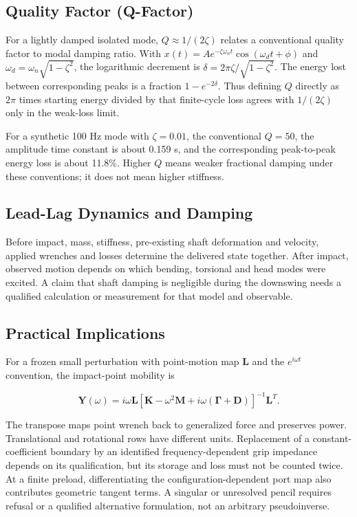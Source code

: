 \subsection{Quality Factor (Q-Factor)}\label{quality-factor-q-factor}

For a lightly damped isolated mode, \(Q\approx1/(2\zeta)\) relates a conventional quality factor to modal damping ratio. With \(x(t)=A e^{-\zeta\omega_n t}\cos(\omega_d t+\phi)\) and \(\omega_d=\omega_n\sqrt{1-\zeta^2}\), the logarithmic decrement is \(\delta=2\pi\zeta/\sqrt{1-\zeta^2}\). The energy lost between corresponding peaks is a fraction \(1-e^{-2\delta}\). Thus defining \(Q\) directly as \(2\pi\) times starting energy divided by that finite-cycle loss agrees with \(1/(2\zeta)\) only in the weak-loss limit.

For a synthetic 100 Hz mode with \(\zeta=0.01\), the conventional \(Q=50\), the amplitude time constant is about 0.159 s, and the corresponding peak-to-peak energy loss is about 11.8\%. Higher \(Q\) means weaker fractional damping under these conventions; it does not mean higher stiffness.

\subsection{Lead-Lag Dynamics and
Damping}\label{lead-lag-dynamics-and-damping}

Before impact, mass, stiffness, pre-existing shaft deformation and velocity, applied wrenches and losses determine the delivered state together. After impact, observed motion depends on which bending, torsional and head modes were excited. A claim that shaft damping is negligible during the downswing needs a qualified calculation or measurement for that model and observable.

\subsection{Practical Implications}\label{practical-implications}

For a frozen small perturbation with point-motion map \(\mathbf L\) and the \(e^{i\omega t}\) convention, the impact-point mobility is

\[
\mathbf Y(\omega)=i\omega\mathbf L
\left[\mathbf K-\omega^2\mathbf M+i\omega(\boldsymbol\Gamma+\mathbf D)\right]^{-1}\mathbf L^T.
\]

The transpose maps point wrench back to generalized force and preserves power. Translational and rotational rows have different units. Replacement of a constant-coefficient boundary by an identified frequency-dependent grip impedance depends on its qualification, but its storage and loss must not be counted twice. At a finite preload, differentiating the configuration-dependent port map also contributes geometric tangent terms. A singular or unresolved pencil requires refusal or a qualified alternative formulation, not an arbitrary pseudoinverse.

